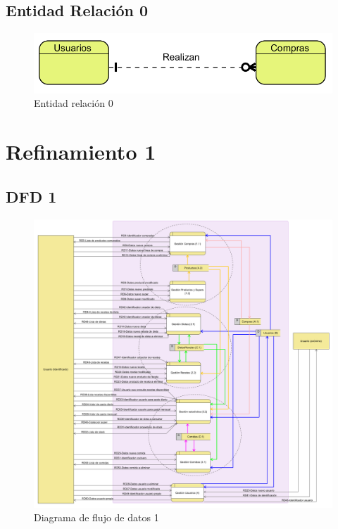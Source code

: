 \documentclass[a4paper,12pt]{report}
\begin{document}
\section{Entidad Relación 0}
\label{sec-4-3}
\begin{figure}[!htp]
\centering
\includegraphics[width=0.6\linewidth]{./refinamientos/er0.png}
\caption{Entidad relación 0}
\label{fig:Entidad relación 0}
\medskip
\footnotesize
{}
\end{figure}
\chapter{Refinamiento 1}
\label{sec-5}
\section{DFD 1}
\label{sec-5-1}
\begin{figure}[!htp]
\centering
\includegraphics[width=1\linewidth]{./refinamientos/dfd1.png}
\caption{Diagrama de flujo de datos 1}
\label{fig:Diagrama de flujo de datos 1}
\medskip
\footnotesize
{}
\end{figure}
\end{document}
